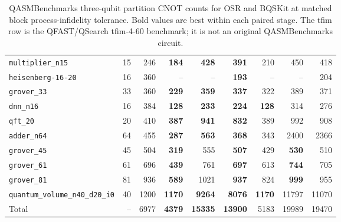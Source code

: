 \begin{table}[p]
\begin{tabular}{lrr|rrr|rrr}
\texttt{multiplier\_n15} & 15 & 246 & \textbf{184} & \textbf{428} & \textbf{391} & 210 & 450 & 418 \\
\texttt{heisenberg-16-20} & 16 & 360 & -- & -- & \textbf{193} & -- & -- & 204 \\
\texttt{grover\_33} & 33 & 360 & \textbf{229} & \textbf{359} & \textbf{337} & 322 & 389 & 371 \\
\texttt{dnn\_n16} & 16 & 384 & \textbf{128} & \textbf{233} & \textbf{224} & \textbf{128} & 314 & 276 \\
\texttt{qft\_20} & 20 & 410 & \textbf{387} & \textbf{941} & \textbf{832} & 389 & 992 & 908 \\
\texttt{adder\_n64} & 64 & 455 & \textbf{287} & \textbf{563} & \textbf{368} & 343 & 2400 & 2366 \\
\texttt{grover\_45} & 45 & 504 & \textbf{319} & 555 & \textbf{507} & 429 & \textbf{530} & 510 \\
\texttt{grover\_61} & 61 & 696 & \textbf{439} & 761 & \textbf{697} & 613 & \textbf{744} & 705 \\
\texttt{grover\_81} & 81 & 936 & \textbf{589} & 1021 & \textbf{937} & 824 & \textbf{999} & 955 \\
\texttt{quantum\_volume\_n40\_d20\_i0} & 40 & 1200 & \textbf{1170} & \textbf{9264} & \textbf{8076} & \textbf{1170} & 11797 & 11070 \\
\hline
Total & -- & 6977 & \textbf{4379} & \textbf{15335} & \textbf{13900} & 5183 & 19989 & 19470 \\
\hline
\end{tabular}
\caption{QASMBenchmarks three-qubit partition CNOT counts for OSR and BQSKit at matched block process-infidelity tolerance. Bold values are best within each paired stage. The tfim row is the QFAST/QSearch tfim-4-60 benchmark; it is not an original QASMBenchmarks circuit.}
\label{tab:osr-bqskit-three-qubit-qasm-benchmarks-counts}
\end{table}

